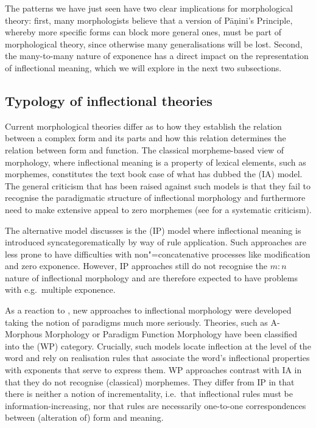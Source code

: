\documentclass[output=paper
 	        ,biblatex
                ,babelshorthands
                ,newtxmath
                ,draftmode
                ,colorlinks, citecolor=brown
]{langscibook}
\begin{document}
The patterns we have just seen have two clear implications for
morphological theory: first, many morphologists believe that
a version of Pāṇini's Principle, whereby more specific forms can block
more general ones, must be part of morphological theory, since
otherwise many generalisations will be lost. 
Second, the many-to-many nature of exponence has a direct impact on
the representation of inflectional meaning, which we will explore in
the next two subsections. 

\subsection{Typology of inflectional theories}
\label{sec:InflTypology}

Current morphological theories differ as to how they establish the
relation between a complex form and its parts and how this relation
determines the relation between form and function. The classical
morpheme-based view of morphology, where inflectional meaning is a
property of lexical elements, such as morphemes, constitutes the text
book case of what \citet{Hockett54} has dubbed the 
(IA) model.  The general criticism that has been raised against such
models is that they fail to recognise the paradigmatic structure of
inflectional morphology and furthermore need to make extensive appeal
to zero morphemes (see \citealp{Anderson92} for a systematic
criticism).

The alternative model \citet{Hockett54} discusses is the
 (IP) model where inflectional meaning is introduced
syncategorematically by way of rule application. Such approaches
are less prone to have difficulties with non"=concatenative processes
like modification and zero exponence. However, IP approaches still do
not recognise the $m:n$ nature of inflectional morphology and are
therefore expected to have problems with e.g.\ multiple exponence. 


As a reaction to \citet{Matthews72}, new approaches to inflectional
morphology were developed taking the notion of paradigms much more
seriously. Theories, such as A-Morphous Morphology \citep{Anderson92}
or Paradigm Function Morphology \citep{Stump01} have been classified
into the  (WP) category. Crucially, such models
locate inflection at the level of the word and rely on realisation
rules that associate the word's inflectional properties with exponents
that serve to express them. WP approaches contrast with IA in that
they do not recognise (classical) morphemes. They differ from IP in
that there is neither a notion of incrementality, i.e.\ that
inflectional rules must be information-increasing, nor that rules are
necessarily one-to-one correspondences between (alteration of) form
and meaning.
\end{document}

